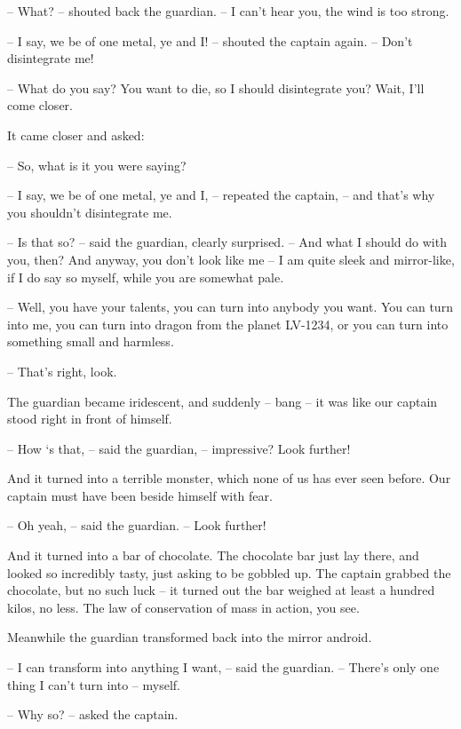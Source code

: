 \documentclass[ebook,twoside,final,openright]{memoir}
\begin{document}
– What? – shouted back the guardian. – I can’t hear you, the wind is too strong.\par
– I say, we be of one metal, ye and I! – shouted the captain again. – Don’t disintegrate me!\par
– What do you say? You want to die, so I should disintegrate you? Wait, I'll come closer.\par
\par
It came closer and asked:\par
– So, what is it you were saying?\par
– I say, we be of one metal, ye and I, – repeated the captain, – and that’s why you shouldn’t disintegrate me.\par
– Is that so? – said the guardian, clearly surprised. – And what I should do with you, then? And anyway, you don’t look like me – I am quite sleek and mirror-like, if I do say so myself, while you are somewhat pale.\par
– Well, you have your talents, you can turn into anybody you want. You can turn into me, you can turn into dragon from the planet LV-1234, or you can turn into something small and harmless.\par
– That's right, look.\par
\par
The guardian became iridescent, and suddenly – bang – it was like our captain stood right in front of himself.\par
– How ‘s that, – said the guardian, – impressive? Look further!\par
And it turned into a terrible monster, which none of us has ever seen before. Our captain must have been beside himself with fear.\par
– Oh yeah, – said the guardian. – Look further!\par
\par
And it turned into a bar of chocolate. The chocolate bar just lay there, and looked so incredibly tasty, just asking to be gobbled up. The captain grabbed the chocolate, but no such luck – it turned out the bar weighed at least a hundred kilos, no less. The law of conservation of mass in action, you see.\par
\par
Meanwhile the guardian transformed back into the mirror android.\par
– I can transform into anything I want, – said the guardian. – There’s only one thing I can’t turn into – myself.\par
– Why so? – asked the captain.\par
\end{document}
